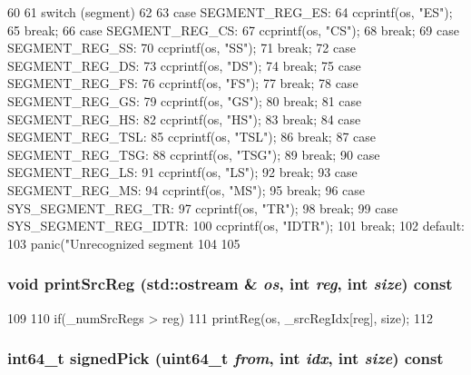 \begin{DoxyCode}
60     {
61         switch (segment)
62         {
63           case SEGMENT_REG_ES:
64             ccprintf(os, "ES");
65             break;
66           case SEGMENT_REG_CS:
67             ccprintf(os, "CS");
68             break;
69           case SEGMENT_REG_SS:
70             ccprintf(os, "SS");
71             break;
72           case SEGMENT_REG_DS:
73             ccprintf(os, "DS");
74             break;
75           case SEGMENT_REG_FS:
76             ccprintf(os, "FS");
77             break;
78           case SEGMENT_REG_GS:
79             ccprintf(os, "GS");
80             break;
81           case SEGMENT_REG_HS:
82             ccprintf(os, "HS");
83             break;
84           case SEGMENT_REG_TSL:
85             ccprintf(os, "TSL");
86             break;
87           case SEGMENT_REG_TSG:
88             ccprintf(os, "TSG");
89             break;
90           case SEGMENT_REG_LS:
91             ccprintf(os, "LS");
92             break;
93           case SEGMENT_REG_MS:
94             ccprintf(os, "MS");
95             break;
96           case SYS_SEGMENT_REG_TR:
97             ccprintf(os, "TR");
98             break;
99           case SYS_SEGMENT_REG_IDTR:
100             ccprintf(os, "IDTR");
101             break;
102           default:
103             panic("Unrecognized segment %
104         }
105     }
\end{DoxyCode}
\hypertarget{classX86ISA_1_1X86StaticInst_abc6c6b8e210a0a3ad80ae6f8f3ef1e9b}{
\subsubsection[{printSrcReg}]{\setlength{\rightskip}{0pt plus 5cm}void printSrcReg (std::ostream \& {\em os}, \/  int {\em reg}, \/  int {\em size}) const}}
\label{classX86ISA_1_1X86StaticInst_abc6c6b8e210a0a3ad80ae6f8f3ef1e9b}



\begin{DoxyCode}
109     {
110         if(_numSrcRegs > reg)
111             printReg(os, _srcRegIdx[reg], size);
112     }
\end{DoxyCode}
\hypertarget{classX86ISA_1_1X86StaticInst_a25c7db2a9cdba1e14cbc6eaf3acb6d33}{
\subsubsection[{signedPick}]{\setlength{\rightskip}{0pt plus 5cm}int64\_\-t signedPick (uint64\_\-t {\em from}, \/  int {\em idx}, \/  int {\em size}) const}}
\label{classX86ISA_1_1X86StaticInst_a25c7db2a9cdba1e14cbc6eaf3acb6d33}



